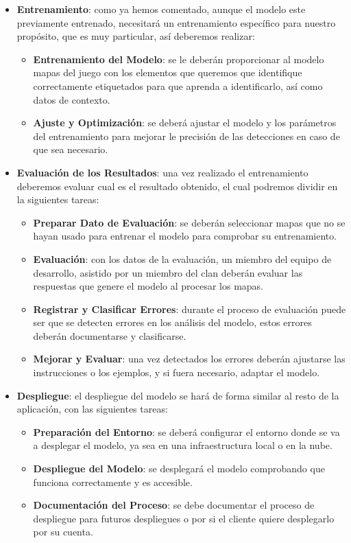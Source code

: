 \begin{itemize}
	\item \textbf{Entrenamiento}: como ya hemos comentado, aunque el modelo este previamente entrenado, necesitará un entrenamiento específico para nuestro propósito, que es muy particular, así deberemos realizar:
	\begin{itemize}
		\item \textbf{Entrenamiento del Modelo}: se le deberán proporcionar al modelo mapas del juego con los elementos que queremos que identifique correctamente etiquetados para que aprenda a identificarlo, así como datos de contexto.
		\item \textbf{Ajuste y Optimización}: se deberá ajustar el modelo y los parámetros del entrenamiento para mejorar le precisión de las detecciones en caso de que sea necesario.
	\end{itemize}
	
	\item \textbf{Evaluación de los Resultados}: una vez realizado el entrenamiento deberemos evaluar cual es el resultado obtenido, el cual podremos dividir en la siguientes tareas:
	\begin{itemize}
		\item \textbf{Preparar Dato de Evaluación}: se deberán seleccionar mapas que no se hayan usado para entrenar el modelo para comprobar su entrenamiento.
		\item \textbf{Evaluación}: con los datos de la evaluación, un miembro del equipo de desarrollo, asistido por un miembro del clan deberán evaluar las respuestas que genere el modelo al procesar los mapas. 
		\item \textbf{Registrar y Clasificar Errores}: durante el proceso de evaluación puede ser que se detecten errores en los análisis del modelo, estos errores deberán documentarse y clasificarse.
		\item \textbf{Mejorar y Evaluar}: una vez detectados los errores deberán ajustarse las instrucciones o los ejemplos, y si fuera necesario, adaptar el modelo.
	\end{itemize}
	
	\item \textbf{Despliegue}: el despliegue del modelo se hará de forma similar al resto de la aplicación, con las siguientes tareas: 
	\begin{itemize}
		\item \textbf{Preparación del Entorno}: se deberá configurar el entorno donde se va a desplegar el modelo, ya sea en una infraestructura local o en la nube.
		\item \textbf{Despliegue del Modelo}: se desplegará el modelo comprobando que funciona correctamente y es accesible.
		\item \textbf{Documentación del Proceso}: se debe documentar el proceso de despliegue para futuros despliegues o por si el cliente quiere desplegarlo por su cuenta.
	\end{itemize}
	

\end{itemize}
